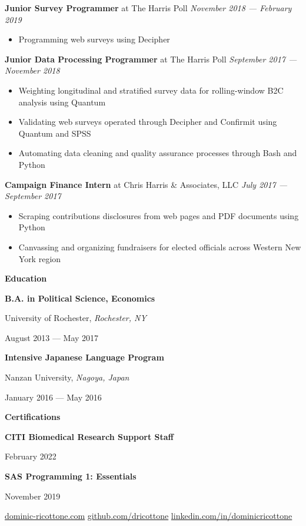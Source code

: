 \documentclass[12pt]{article}
\begin{document}
\noindent \textbf{Junior Survey Programmer} at The Harris Poll \hfill \textit{November 2018 --- February 2019}
\begin{itemize}[]
\item Programming web surveys using Decipher
\end{itemize}

\noindent \textbf{Junior Data Processing Programmer} at The Harris Poll \hfill \textit{September 2017 --- November 2018}
\begin{itemize}[]
\item Weighting longitudinal and stratified survey data for rolling-window B2C analysis using Quantum
\item Validating web surveys operated through Decipher and Confirmit using Quantum and SPSS
\item Automating data cleaning and quality assurance processes through Bash and Python
\end{itemize}

\noindent \textbf{Campaign Finance Intern} at Chris Harris \& Associates, LLC \hfill \textit{July 2017 --- September 2017}
\begin{itemize}[]
\item Scraping contributions disclosures from web pages and PDF documents using Python
\item Canvassing and organizing fundraisers for elected officials across Western New York region
\end{itemize}

\large
\noindent \textbf{Education} \hrulefill
\normalsize

\begin{multicols}{2}[]
\noindent \textbf{B.A. in Political Science, Economics} \par
University of Rochester, \textit{Rochester, NY} \par
August 2013 --- May 2017

\noindent \textbf{Intensive Japanese Language Program} \par
Nanzan University, \textit{Nagoya, Japan} \par
January 2016 --- May 2016
\end{multicols}

\large
\noindent \textbf{Certifications} \hrulefill
\normalsize

\begin{multicols}{2}[]
\noindent \textbf{CITI Biomedical Research Support Staff} \par
February 2022

\noindent \textbf{SAS Programming 1: Essentials} \par
November 2019
\end{multicols}

\vfill
\begin{mdframed}[hidealllines=true,backgroundcolor=Salmon]
\footnotesize \centering
{} \enspace \href{https://www.dominic-ricottone.com}{dominic-ricottone.com}
\quad
{} \enspace \href{https://github.com/dricottone}{github.com/dricottone}
\quad
{} \enspace \href{https://www.linkedin.com/in/dominicricottone}{linkedin.com/in/dominicricottone}
\end{mdframed}
\end{document}
